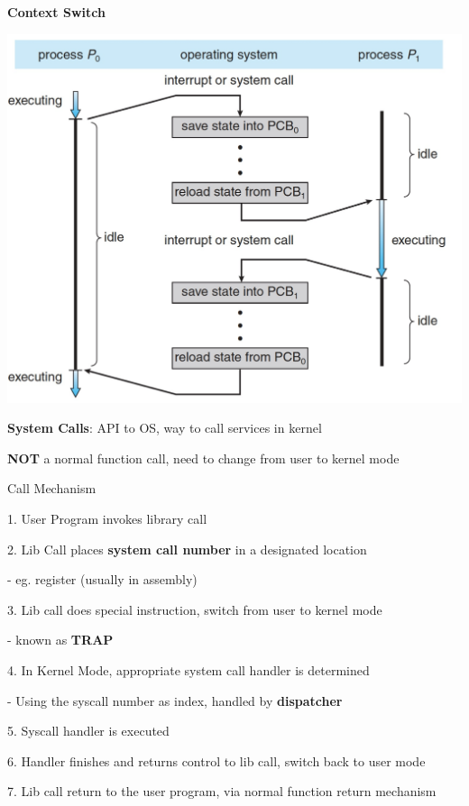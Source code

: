 \documentclass[10pt, a4paper]{article}
\newcommand{\highlight}[1]{{\color{red}\textbf{#1}}}
\newcommand{\red}[1]{{\color{red}#1}}
\newcommand{\green}[1]{{\color{ForestGreen}#1}}
\newcommand{\tab}[0]{\hspace*{2mm}}
\begin{document}
\begin{multicols*}{3}

		\textbf{Context Switch}

		\includegraphics[scale=0.28]{./assets/contextSwitch.png}

		\textbf{System Calls}: API to OS, way to call services in kernel

		\highlight{NOT} a normal function call, need to change from \green{user} to \red{kernel} mode

		Call Mechanism

		1. User Program invokes library call

		2. Lib Call places \highlight{system call number} in a designated location

		\tab{} - eg. register (usually in assembly)

		3. Lib call does special instruction, switch from \green{user} to \red{kernel} mode

		\tab{} - known as \textbf{TRAP}

		4. In Kernel Mode, appropriate system call handler is determined

		\tab{} - Using the syscall number as index, handled by \textbf{dispatcher}

		5. Syscall handler is executed

		6. Handler finishes and returns control to lib call, switch back to \green{user} mode

		7. Lib call return to the user program, via normal function return mechanism


\end{multicols*}
\end{document}
